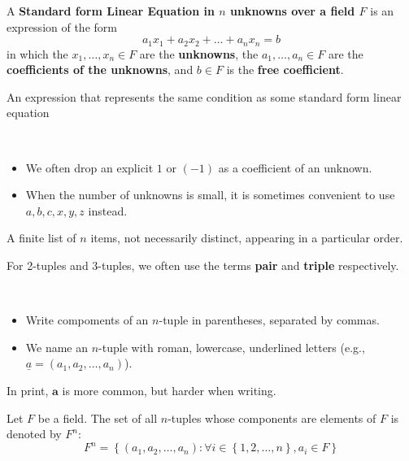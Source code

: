 \begin{definition}\label{def:standard-form-linear-equation}
    A \textbf{Standard form Linear Equation in $n$ unknowns over a field $F$} is an expression of the form
    \[a_1x_1+a_2x_2+\ldots+a_nx_n=b\]
    in which the $x_1,\ldots,x_n \in F$ are the \textbf{unknowns}, the $a_1,\ldots,a_n \in F$ are the \textbf{coefficients of the unknowns}, and $b \in F$ is the \textbf{free coefficient}.
\end{definition}
\begin{definition*}\label{def:linear-equation}
    An expression that represents the same condition as some standard form linear equation
\end{definition*}
\begin{note}\
    \begin{itemize}
        \item We often drop an explicit $1$ or $\left(-1\right)$ as a coefficient of an unknown.
        \item When the number of unknowns is small, it is sometimes convenient to use $a,b,c,x,y,z$ instead.
    \end{itemize}
\end{note}
\begin{definition}[$n$-tuple]\label{def:n-tuple}
    A finite list of $n$ items, not necessarily distinct, appearing in a particular order.
    \begin{note}
        For 2-tuples and 3-tuples, we often use the terms \textbf{pair} and \textbf{triple} respectively.
    \end{note}
    \begin{notation}\ 
        \begin{itemize}
            \item Write compoments of an $n$-tuple in parentheses, separated by commas. 
            \item We name an $n$-tuple with roman, lowercase, underlined letters (e.g., $\underline{a}=\left(a_1,a_2,\ldots,a_n\right)$).
        \end{itemize}
        \begin{note}
            In print, $\textbf{a}$ is more common, but harder when writing.
        \end{note}
    \end{notation}
\end{definition}
\begin{definition}[$F^n$]\label{def:set-of-n-tuples}
    Let $F$ be a field. The set of all $n$-tuples whose components are elements of $F$ is denoted by $F^n$:
    \[
    F^n = \left\{\left(a_1,a_2,\ldots,a_n\right) : \forall i \in \left\{1,2,\ldots,n\right\}, a_i \in F \right\} 
    \]
    
\end{definition}
